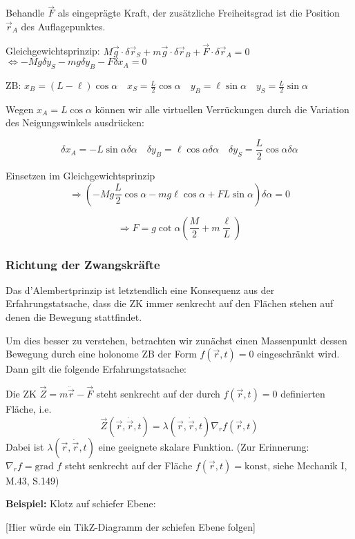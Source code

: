 \documentclass[10pt, letterpaper]{article}
\begin{document}
Behandle $\vec{F}$ als eingeprägte Kraft, der zusätzliche Freiheitsgrad ist die Position $\vec{r}_A$ des Auflagepunktes.

Gleichgewichtsprinzip: $M\vec{g} \cdot \delta\vec{r}_S + m\vec{g} \cdot \delta\vec{r}_B + \vec{F} \cdot \delta\vec{r}_A = 0$
$\Leftrightarrow -Mg \delta y_S - mg \delta y_B - F\delta x_A = 0$

ZB: $x_B = (L-\ell)\cos\alpha \quad x_S = \frac{L}{2} \cos\alpha \quad
    y_B = \ell \sin\alpha \quad y_S = \frac{L}{2} \sin\alpha$

Wegen $x_A = L\cos\alpha$ können wir alle virtuellen Verrückungen durch die Variation des Neigungswinkels ausdrücken:

$$\delta x_A = -L\sin\alpha \delta\alpha \quad
\delta y_B = \ell \cos\alpha \delta\alpha \quad
\delta y_S = \frac{L}{2} \cos\alpha \delta\alpha$$

Einsetzen im Gleichgewichtsprinzip
\[\Rightarrow(-Mg\frac{L}{2}\cos\alpha - mg\ell\cos\alpha + FL\sin\alpha)\delta\alpha = 0\]

\[\Rightarrow F = g\cot\alpha\left(\frac{M}{2} + m\frac{\ell}{L}\right)\]



\pagebreak

\subsubsection{Richtung der Zwangskräfte}

Das d'Alembertprinzip ist letztendlich eine Konsequenz aus der Erfahrungstatsache, dass die ZK immer senkrecht auf den Flächen stehen auf denen die Bewegung stattfindet.

Um dies besser zu verstehen, betrachten wir zunächst einen Massenpunkt dessen Bewegung durch eine holonome ZB der Form $f(\vec{r},t)=0$ eingeschränkt wird. Dann gilt die folgende Erfahrungstatsache:

Die ZK $\vec{Z} = m\ddot{\vec{r}}-\vec{F}$ steht senkrecht auf der durch $f(\vec{r},t)=0$ definierten Fläche, i.e. 
$$\vec{Z}(\vec{r},\dot{\vec{r}},t)=\lambda(\vec{r},\dot{\vec{r}},t)\nabla_rf(\vec{r},t)$$
Dabei ist $\lambda(\vec{r},\dot{\vec{r}},t)$ eine geeignete skalare Funktion. (Zur Erinnerung: $\nabla_rf = \text{grad }f$ steht senkrecht auf der Fläche $f(\vec{r},t) = \text{konst}$, siehe Mechanik I, M.43, S.149)



\textbf{Beispiel:} Klotz auf schiefer Ebene:

[Hier würde ein TikZ-Diagramm der schiefen Ebene folgen]
\end{document}
